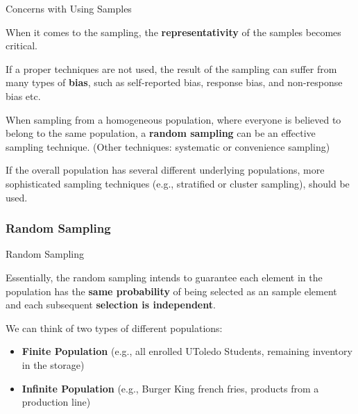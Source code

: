 \documentclass{beamer}
\begin{document}
\begin{frame}{Concerns with Using Samples}

When it comes to the sampling, the \textbf{representativity} of the samples becomes critical. 

\vspace{0.3 cm}
If a proper techniques are not used, the result of the sampling can suffer from many types of \textbf{bias}, such as self-reported bias, response bias, and non-response bias etc.

\vspace{0.3 cm}
When sampling from a homogeneous population, where everyone is believed to belong to the same population, a \textbf{random sampling} can be an effective sampling technique. (Other techniques: systematic or convenience sampling)

\vspace{0.3 cm}
If the overall population has several different underlying populations, more sophisticated sampling techniques (e.g., stratified or cluster sampling),  should be used.

\end{frame}


\subsubsection{Random Sampling}

\begin{frame}{Random Sampling}

Essentially, the random sampling intends to guarantee each element in the population has the \textbf{same probability} of being selected as an sample element and each subsequent \textbf{selection is independent}.

\vspace{0.3 cm}
We can think of two types of different populations: 
\begin{itemize}
\item \textbf{Finite Population} (e.g., all enrolled UToledo Students, remaining inventory in the storage)
\item \textbf{Infinite Population} (e.g., Burger King french fries, products from a production line)
\end{itemize}


\end{frame}
\end{document}
